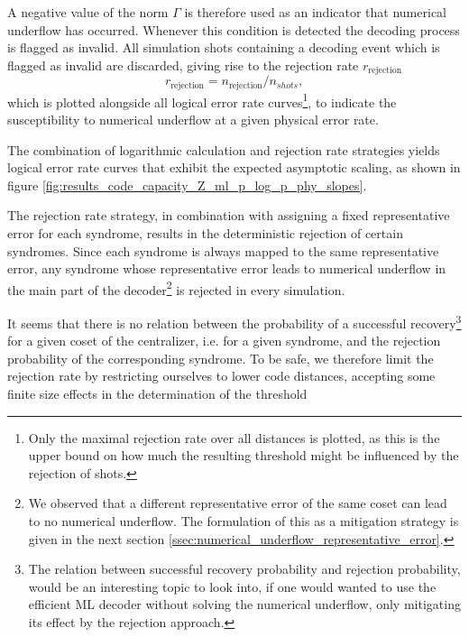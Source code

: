 A negative value of the norm $\Gamma$ is therefore used as an indicator that numerical underflow has occurred. 
Whenever this condition is detected the decoding process is flagged as invalid.
All simulation shots containing a decoding event which is flagged as invalid are discarded, 
giving rise to the rejection rate $r_{\mathrm{rejection}}$ 
\begin{equation}
    r_{\mathrm{rejection}} = n_{\mathrm{rejection}}/n_{shots},
\end{equation}
which is plotted alongside all logical error rate curves\footnote{
    Only the maximal rejection rate over all distances is plotted, as this is the upper bound on how much the resulting threshold might be influenced by the rejection of shots. 
}, to indicate the susceptibility to numerical underflow at a given physical error rate. 

The combination of logarithmic calculation and rejection rate strategies yields logical error rate curves that exhibit the expected asymptotic scaling, 
as shown in figure \ref{fig:results_code_capacity_Z_ml_p_log_p_phy_slopes}. 

The rejection rate strategy, in combination with assigning a fixed representative error for each syndrome, results in the deterministic rejection of certain syndromes. 
Since each syndrome is always mapped to the same representative error, any syndrome whose representative error leads to numerical underflow in the main part of the decoder\footnote{
    We observed that a different representative error of the same coset can lead to no numerical underflow.
    The formulation of this as a mitigation strategy is given in the next section \ref{ssec:numerical_underflow_representative_error}.
} is rejected in every simulation.

It seems that there is no relation between the probability of a successful recovery\footnote{
    The relation between successful recovery probability and rejection probability, would be an interesting topic to look into, 
    if one would wanted to use the efficient ML decoder without solving the numerical underflow, only mitigating its effect by the rejection approach. 
} for a given coset of the centralizer, i.e. for a given syndrome, and the rejection probability of the corresponding syndrome. 
To be safe, we therefore limit the rejection rate by restricting ourselves to lower code distances, accepting some finite size effects in the determination of the threshold


